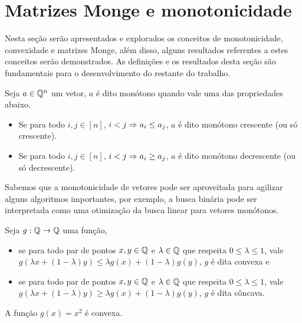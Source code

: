 \section{Matrizes Monge e monotonicidade}
\label{MatrizMonge}


Nesta seção serão apresentados e explorados os conceitos de monotonicidade, convexidade e matrizes Monge, além disso, alguns resultados referentes a estes conceitos serão demonstrados. As definições e os resultados desta seção são fundamentais para o desenvolvimento do restante do trabalho.  

\begin{defi}
Seja $a \in \mathbb{Q}^n$ um vetor, $a$ é dito monótono quando vale uma das propriedades abaixo.
    \begin{itemize}
        \item Se para todo $i,j \in [n]$, $i < j \Rightarrow a_i \leq a_j$, $a$ é dito monótono crescente (ou só crescente).
        \item Se para todo $i,j \in [n]$, $i < j \Rightarrow a_i \geq a_j$, $a$ é dito monótono decrescente (ou só decrescente).
    \end{itemize}
\end{defi}

Sabemos que a monotonicidade de vetores pode ser aproveitada para agilizar alguns algoritmos importantes, por exemplo, a busca binária pode ser interpretada como uma otimização da busca linear para vetores monótonos. 

\begin{defi}
Seja $g : \mathbb{Q} \to \mathbb{Q}$ uma função,
    \begin{itemize}
        \item se para todo par de pontos $x,y \in \mathbb{Q}$ e $\lambda \in \mathbb{Q}$ que respeita $0 \leq \lambda \leq 1$, vale~${g(\lambda x + (1 - \lambda)y) \leq \lambda g(x) + (1 - \lambda) g(y)}$, $g$ é dita convexa e 
        \item se para todo par de pontos $x,y \in \mathbb{Q}$ e $\lambda \in \mathbb{Q}$ que respeita $0 \leq \lambda \leq 1$, vale~${g(\lambda x + (1 - \lambda)y) \geq \lambda g(x) + (1 - \lambda) g(y)}$, $g$ é dita côncava.
    \end{itemize}
\end{defi}

\begin{prop} \label{Monge:sqConv}
A função $g(x) = x^2$ é convexa. 
\end{prop}

